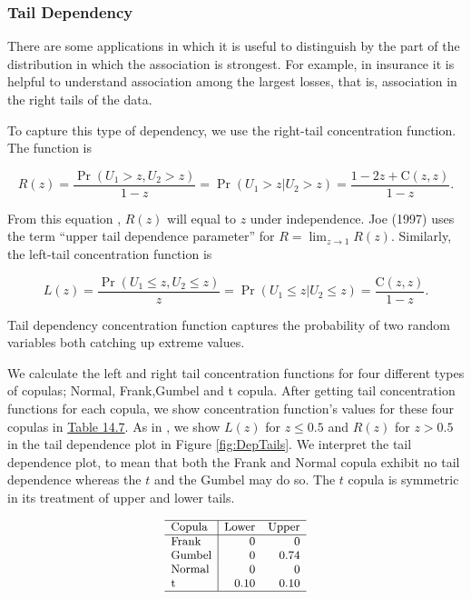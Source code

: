 \documentclass[]{book}
\theoremstyle{definition}
\theoremstyle{definition}
\theoremstyle{definition}
\theoremstyle{remark}
\begin{document}
\subsubsection{Tail Dependency}\label{tail-dependency}

There are some applications in which it is useful to distinguish by the
part of the distribution in which the association is strongest. For
example, in insurance it is helpful to understand association among the
largest losses, that is, association in the right tails of the data.

To capture this type of dependency, we use the right-tail concentration
function. The function is

\[R(z) = \frac{\Pr(U_1 >z, U_2 > z)}{1-z} =\Pr(U_1 > z | U_2 > z) =\frac{1 - 2z + \mathrm{C}(z,z)}{1-z} .\]

From this equation , \(R(z)\) will equal to \(z\) under independence.
Joe (1997) uses the term ``upper tail dependence parameter'' for
\(R = \lim_{z \rightarrow 1} R(z)\). Similarly, the left-tail
concentration function is

\[L(z) = \frac{\Pr(U_1 \leq z, U_2 \leq z)}{z}=\Pr(U_1 \leq z | U_2 \leq z) =\frac{ \mathrm{C}(z,z)}{1-z}.\]

Tail dependency concentration function captures the probability of two
random variables both catching up extreme values.

We calculate the left and right tail concentration functions for four
different types of copulas; Normal, Frank,Gumbel and t copula. After
getting tail concentration functions for each copula, we show
concentration function's values for these four copulas in
\protect\hyperlink{tab:14.7}{Table 14.7}. As in \citet{venter2002tails},
we show \(L(z)\) for \(z\leq 0.5\) and \(R(z)\) for \(z>0.5\) in the
tail dependence plot in Figure \ref{fig:DepTails}. We interpret the tail
dependence plot, to mean that both the Frank and Normal copula exhibit
no tail dependence whereas the \(t\) and the Gumbel may do so. The \(t\)
copula is symmetric in its treatment of upper and lower tails.

\[
{\small \begin{matrix}
\begin{array}{l|rr} 
    \hline
\text{Copula} & \text{Lower}    & \text{Upper}     \\
\hline
\text{Frank}  & 0  & 0   \\
\text{Gumbel}  & 0   & 0.74    \\
\text{Normal}  & 0   & 0    \\
\text{t}  & 0.10   & 0.10    \\
   \hline
\end{array}
\end{matrix}}
\]
\end{document}
